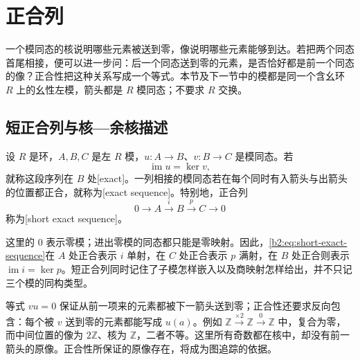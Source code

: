 
\section{正合列}
\label{b2:sec:0303}

一个模同态的核说明哪些元素被送到零，像说明哪些元素能够到达。若把两个同态首尾相接，便可以进一步问：后一个同态送到零的元素，是否恰好都是前一个同态的像？正合性把这种关系写成一个等式。本节及下一节中的模都是同一个含幺环 \(R\) 上的幺性左模，箭头都是 \(R\) 模同态；不要求 \(R\) 交换。

%
%

\subsection{短正合列与核—余核描述}
\label{b2:subsec:0303:01}

\begin{definition}\label{b2:def:exact-sequence}
	设 \(R\) 是环，\(A,B,C\) 是左 \(R\) 模，\(u:A\to B\)、\(v:B\to C\) 是模同态。若
	\[
		\operatorname{im}u=\ker v,
	\]
	就称这段序列在 \(B\) 处[exact]。一列相接的模同态若在每个同时有入箭头与出箭头的位置都正合，就称为[exact sequence]。特别地，正合列
	\begin{equation}\label{b2:eq:short-exact-sequence}
		0\longrightarrow A\xrightarrow{i}B\xrightarrow{p}C\longrightarrow0
	\end{equation}
	称为[short exact sequence]。
\end{definition}

这里的 \(0\) 表示零模；进出零模的同态都只能是零映射。因此，\eqref{b2:eq:short-exact-sequence}在 \(A\) 处正合表示 \(i\) 单射，在 \(C\) 处正合表示 \(p\) 满射，在 \(B\) 处正合则表示 \(\operatorname{im}i=\ker p\)。短正合列同时记住了子模怎样嵌入以及商映射怎样给出，并不只记三个模的同构类型。

\ProseParagraphBreak
等式 \(vu=0\) 保证从前一项来的元素都被下一箭头送到零；正合性还要求反向包含：每个被 \(v\) 送到零的元素都能写成 \(u(a)\)。例如 \(\mathbb Z\xrightarrow{\times2}\mathbb Z\xrightarrow{0}\mathbb Z\) 中，复合为零，而中间位置的像为 \(2\mathbb Z\)、核为 \(\mathbb Z\)，二者不等。这里所有奇数都在核中，却没有前一箭头的原像。正合性所保证的原像存在，将成为图追踪的依据。

